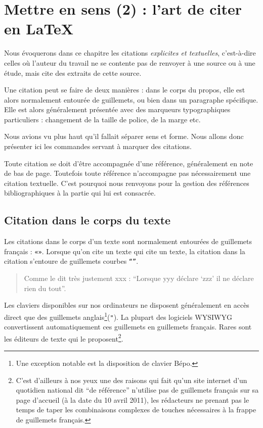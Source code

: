 \chapter{Mettre en sens (2) : l'art de citer en LaTeX}\label{citertexte}

\begin{intro}
Nous évoquerons dans ce chapitre les citations \emph{explicites et textuelles}, c'est-à-dire celles où l'auteur du travail ne se contente pas de renvoyer à une source ou à une étude, mais cite des extraits de cette source.

Une citation peut se faire de deux manières : dans le corps du propos, elle est alors normalement entourée de guillemets, ou bien dans un paragraphe spécifique. Elle est alors généralement présentée avec des marqueurs typographiques particuliers : changement de la taille de police, de la marge etc.

Nous avions vu plus haut qu'il fallait séparer sens et forme. Nous allons donc présenter ici les commandes servant à marquer des citations.

\end{intro}
\begin{attention}
Toute citation se doit d'être accompagnée d'une référence, généralement en note de bas de page. Toutefois toute référence n'accompagne pas nécessairement une citation textuelle. C'est pourquoi nous renvoyons pour la gestion des références bibliographiques à la partie qui lui est consacrée.

\end{attention}

\section{Citation dans le corps du texte}\label{guillemets}

Les citations dans le corps d'un texte sont normalement entourées de guillemets français : \verb|«»|. Lorsque qu'on cite un texte qui cite un texte, la citation dans la citation s'entoure de guillemets courbes \verb|“”|. 

\begin{quotation}
    Comme le dit très justement xxx : \enquote{Lorsque yyy déclare \enquote{zzz} il ne déclare rien du tout}.
\end{quotation}

Les claviers disponibles sur nos ordinateurs ne disposent généralement en accès direct que des guillemets anglais\footnote{Une exception notable est la disposition de clavier Bépo.}(\verb|"|). 
La plupart des logiciels WYSIWYG convertissent automatiquement ces guillemets en guillemets français. Rares sont les éditeurs de texte qui le proposent\footnote{C'est d'ailleurs à nos yeux une des raisons qui fait qu'un site internet d'un quotidien national dit \enquote{de référence} n'utilise pas de guillemets français sur sa page d'accueil (à la date du 10 avril 2011), les rédacteurs ne prenant pas le temps de taper les combinaisons complexes de touches nécessaires à la frappe de guillemets français.}. 

